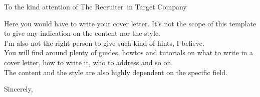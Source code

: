 \documentclass[a4paper]{letter}
\def\company{Target Company}
\def\recruiter{The Recruiter}
\def\companyaddress{Somestreet, 1 \newline 0000 City \newline Country}
\begin{document}
  \begin{letter}{}

  \opening{To the kind attention of \recruiter ~in \company}

  Here you would have to write your cover letter. It's not the scope of this template to give any indication on the content nor the style.\\
  I'm also not the right person to give such kind of hints, I believe.\\
  You will find around plenty of guides, howtos and tutorials on what to write in a cover letter, how to write it, who to address and so on.\\
  The content and the style are also highly dependent on the specific field.\\

  \closing{Sincerely,}

  \end{letter}
\end{document}
